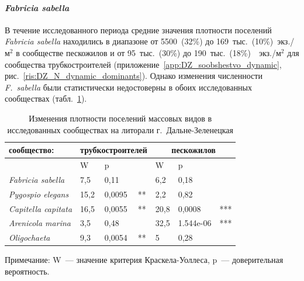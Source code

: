 \paragraph{\textit{Fabricia sabella}}
В течение исследованного периода средние значения плотности поселений {\it Fabricia sabella} находились в диапазоне от 5500~(32\%) до 169~тыс.~(10\%)~экз./м$^2$ в сообществе пескожилов и от 95~тыс.~(30\%) до 190~тыс.~(18\%)~~экз./м$^2$ для сообщества трубкостроителей (приложение~\ref{app:DZ_soobshestvo_dynamic}, рис.~\ref{ris:DZ_N_dynamic_dominants}). 
Однако изменения численности \textit{F.~sabella} были статистически недостоверны в обоих исследованных сообществах (табл.~\ref{tab:DZ_trends_Kruskal-Wallis}). 
\begin{table}[p]
\caption{Изменения плотности поселений массовых видов в исследованных сообществах на литорали г.~Дальне-Зеленецкая}
\label{tab:DZ_trends_Kruskal-Wallis}
\begin{tabularx}{\textwidth}{l|XXl|XXl}
\hline
сообщество: & \multicolumn{3}{c|}{трубкостроителей}&\multicolumn{3}{c|}{пескожилов}\\ \hline
                   & W               & p      &    & W         & p         &     \\ \hline
{\it Fabricia sabella}   & 7,5             & 0,11   &    & 6,2       & 0,18      &     \\
{\it Pygospio elegans}   & 15,2            & 0,0095 & ** & 2,2       & 0,82      &     \\
{\it Capitella capitata} & 16,5            & 0,0055 & ** & 20,8      & 0,0008    & *** \\
{\it Arenicola marina}   & 3,5             & 0,48   &    & 32,5      & 1.544e-06 & *** \\
{\it Oligochaeta}        & 9,3             & 0,0054 & ** & 5         & 0,28      &  	\\ \hline  
\end{tabularx}

{\footnotesize Примечание: W~--- значение критерия Краскела-Уоллеса, p~--- доверительная вероятность.}
\end{table}

